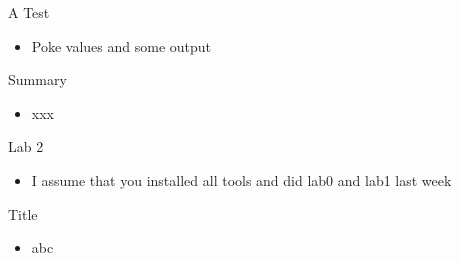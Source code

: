 

\begin{frame}[fragile]{A Test}
\begin{itemize}
\item Poke values and  some output
\end{itemize}
\end{frame}

%




\begin{frame}[fragile]{Summary}
\begin{itemize}
\item xxx
\end{itemize}
\end{frame}

\begin{frame}[fragile]{Lab 2}
\begin{itemize}
\item I assume that you installed all tools and did lab0 and lab1 last week
\end{itemize}
\end{frame}



\begin{frame}[fragile]{Title}
\begin{itemize}
\item abc
\end{itemize}
\end{frame}
